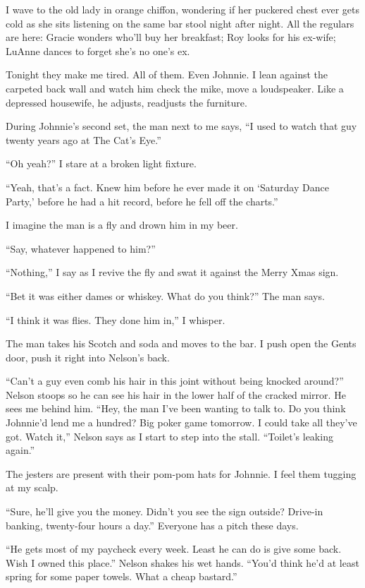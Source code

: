 \documentclass[twoside,10pt]{book}
\begin{document}
I wave to the old lady in orange chiffon, wondering if her puckered
chest ever gets cold as she sits listening on the same bar stool night
after night. All the regulars are here: Gracie wonders who'll buy her
breakfast; Roy looks for his ex-wife; LuAnne dances to forget she's no
one's ex.

Tonight they make me tired. All of them. Even Johnnie. I lean against
the carpeted back wall and watch him check the mike, move a loudspeaker.
Like a depressed housewife, he adjusts, readjusts the furniture.

During Johnnie's second set, the man next to me says, ``I used to watch
that guy twenty years ago at The Cat's Eye.''

``Oh yeah?'' I stare at a broken light fixture.

``Yeah, that's a fact. Knew him before he ever made it on `Saturday
Dance Party,' before he had a hit record, before he fell off the
charts.''

I imagine the man is a fly and drown him in my beer.

``Say, whatever happened to him?''

``Nothing,'' I say as I revive the fly and swat it against the Merry
Xmas sign.

``Bet it was either dames or whiskey. What do you think?'' The man says.

``I think it was flies. They done him in,'' I whisper.

The man takes his Scotch and soda and moves to the bar. I push open the
Gents door, push it right into Nelson's back.

``Can't a guy even comb his hair in this joint without being knocked
around?'' Nelson stoops so he can see his hair in the lower half of the
cracked mirror. He sees me behind him. ``Hey, the man I've been wanting
to talk to. Do you think Johnnie'd lend me a hundred? Big poker game
tomorrow. I could take all they've got. Watch it,'' Nelson says as I
start to step into the stall. ``Toilet's leaking again.''

The jesters are present with their pom-pom hats for Johnnie. I feel them
tugging at my scalp.

``Sure, he'll give you the money. Didn't you see the sign outside?
Drive-in banking, twenty-four hours a day.'' Everyone has a pitch these
days.

``He gets most of my paycheck every week. Least he can do is give some
back. Wish I owned this place.'' Nelson shakes his wet hands. ``You'd
think he'd at least spring for some paper towels. What a cheap
bastard.''
\end{document}
